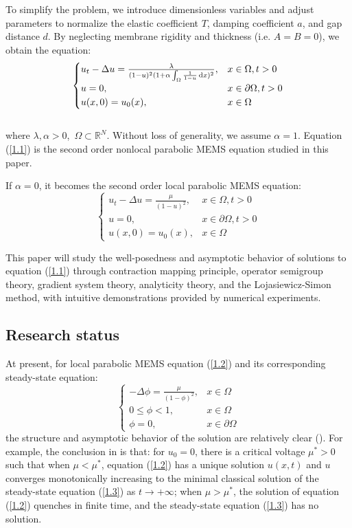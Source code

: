 \documentclass{article}
\numberwithin{equation}{section}
\begin{document}
To simplify the problem, we introduce dimensionless variables and adjust parameters to normalize the elastic coefficient $T$, damping coefficient $a$, and gap distance $d$. By neglecting membrane rigidity and thickness (i.e. $A = B = 0$), we obtain the equation:
\begin{equation}
    \noindent
    \begin{cases}
        u_{t}-\Delta u=\frac{\lambda}{(1-u)^2(1+\alpha\int_{\Omega}\frac{1}{1-u}\,\mathrm{d}x)^2},&x\in\Omega,t>0\\
        u=0,&x\in\partial\Omega,t>0\\
        u(x,0)=u_0(x),&x\in\Omega
    \end{cases}\label{1.1}
\end{equation}\\
where $\lambda,\alpha>0$,\ $\Omega\subset\mathbb{R}^{N}$. Without loss of generality, we assume $\alpha = 1$. Equation (\ref{1.1}) is the second order nonlocal parabolic MEMS equation studied in this paper.

If $\alpha = 0$, it becomes the second order local parabolic MEMS equation:
\begin{equation}
    \begin{cases}
        u_{t}-\Delta u=\frac{\mu}{(1-u)^2},&x\in\Omega,t>0\\
        u=0,&x\in\partial\Omega,t>0\\
        u(x,0)=u_0(x),&x\in\Omega
    \end{cases}\label{1.2}
\end{equation}

This paper will study the well-posedness and asymptotic behavior of solutions to equation (\ref{1.1}) through contraction mapping principle, operator semigroup theory, gradient system theory, analyticity theory, and the Lojasiewicz-Simon method, with intuitive demonstrations provided by numerical experiments.

\subsection{Research status}

\qquad At present, for local parabolic MEMS equation (\ref{1.2}) and its corresponding steady-state equation:
\begin{equation}
    \begin{cases}
        -\Delta \phi=\frac{\mu}{(1-\phi)^2},&x\in\Omega\\
        0 \le \phi<1,&x\in\Omega\\
        \phi=0,&x\in\partial\Omega
    \end{cases}\label{1.3}
\end{equation}
the structure and asymptotic behavior of the solution are relatively clear (\cite{ref7}\cite{ref12}\cite{ref15}). For example, the conclusion in \cite{ref7} is that: for $u_0=0$, there is a critical voltage $\mu^{*}>0$ such that when $\mu<\mu^{*}$, equation (\ref{1.2}) has a unique solution $u(x,t)$ and $u$ converges monotonically increasing to the minimal classical solution of the steady-state equation (\ref{1.3}) as $t\to +\infty$; when $\mu>\mu^{*}$, the solution of equation (\ref{1.2}) quenches in finite time, and the steady-state equation (\ref{1.3}) has no solution.
\end{document}

